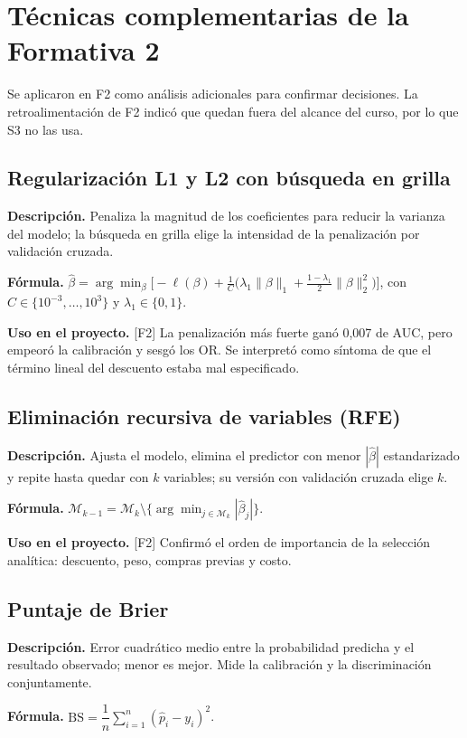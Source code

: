 \documentclass[11pt,a4paper]{article}
\newcommand{\desc}{\textbf{Descripción.} }
\newcommand{\formula}{\textbf{Fórmula.} }
\newcommand{\uso}{\textbf{Uso en el proyecto.} }
\newcommand{\fase}[1]{{\footnotesize\color{gris}[#1]}}
\begin{document}
\section{Técnicas complementarias de la Formativa 2}\label{sec:complementarias}
Se aplicaron en F2 como análisis adicionales para confirmar decisiones. La retroalimentación de F2 indicó que quedan fuera del alcance del curso, por lo que S3 no las usa.

\subsection{Regularización L1 y L2 con búsqueda en grilla}
\desc Penaliza la magnitud de los coeficientes para reducir la varianza del modelo; la búsqueda en grilla elige la intensidad de la penalización por validación cruzada.

\formula $\hat\beta=\arg\min_\beta\Big[-\ell(\beta)+\frac1C\big(\lambda_1\|\beta\|_1+\tfrac{1-\lambda_1}{2}\|\beta\|_2^2\big)\Big]$, con $C\in\{10^{-3},\dots,10^3\}$ y $\lambda_1\in\{0,1\}$.

\uso \fase{F2} La penalización más fuerte ganó 0,007 de AUC, pero empeoró la calibración y sesgó los OR. Se interpretó como síntoma de que el término lineal del descuento estaba mal especificado.

\subsection{Eliminación recursiva de variables (RFE)}
\desc Ajusta el modelo, elimina el predictor con menor $|\hat\beta|$ estandarizado y repite hasta quedar con $k$ variables; su versión con validación cruzada elige $k$.

\formula $\mathcal M_{k-1}=\mathcal M_k\setminus\{\arg\min_{j\in\mathcal M_k}|\hat\beta_j|\}$.

\uso \fase{F2} Confirmó el orden de importancia de la selección analítica: descuento, peso, compras previas y costo.

\subsection{Puntaje de Brier}
\desc Error cuadrático medio entre la probabilidad predicha y el resultado observado; menor es mejor. Mide la calibración y la discriminación conjuntamente.

\formula $\mathrm{BS}=\dfrac1n\displaystyle\sum_{i=1}^n(\hat p_i-y_i)^2$.
\end{document}

